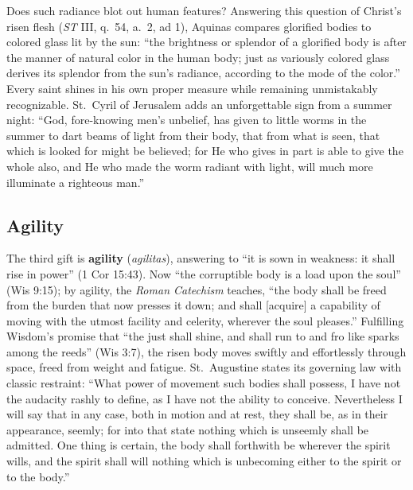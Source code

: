 Does such radiance blot out human features? Answering this question of Christ's risen flesh (\textit{ST} III, q.\ 54, a.\ 2, ad 1), Aquinas compares glorified bodies to colored glass lit by the sun: ``the brightness or splendor of a glorified body is after the manner of natural color in the human body; just as variously colored glass derives its splendor from the sun's radiance, according to the mode of the color.'' Every saint shines in his own proper measure while remaining unmistakably recognizable. St.\ Cyril of Jerusalem adds an unforgettable sign from a summer night: ``God, fore-knowing men's unbelief, has given to little worms in the summer to dart beams of light from their body, that from what is seen, that which is looked for might be believed; for He who gives in part is able to give the whole also, and He who made the worm radiant with light, will much more illuminate a righteous man.''

\subsection*{Agility}

The third gift is \textbf{agility} (\textit{agilitas}), answering to ``it is sown in weakness: it shall rise in power'' (1 Cor 15:43). Now ``the corruptible body is a load upon the soul'' (Wis 9:15); by agility, the \textit{Roman Catechism} teaches, ``the body shall be freed from the burden that now presses it down; and shall [acquire] a capability of moving with the utmost facility and celerity, wherever the soul pleases.'' Fulfilling Wisdom's promise that ``the just shall shine, and shall run to and fro like sparks among the reeds'' (Wis 3:7), the risen body moves swiftly and effortlessly through space, freed from weight and fatigue. St.\ Augustine states its governing law with classic restraint: ``What power of movement such bodies shall possess, I have not the audacity rashly to define, as I have not the ability to conceive. Nevertheless I will say that in any case, both in motion and at rest, they shall be, as in their appearance, seemly; for into that state nothing which is unseemly shall be admitted. One thing is certain, the body shall forthwith be wherever the spirit wills, and the spirit shall will nothing which is unbecoming either to the spirit or to the body.''

